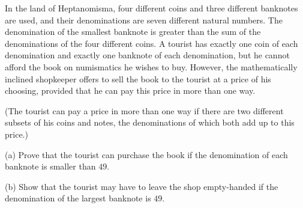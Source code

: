 In the land of Heptanomisma, four different coins and three different banknotes are used, and their denominations are seven different natural numbers. The denomination of the smallest banknote is greater than the sum of the denominations of the four different coins. A tourist has exactly one coin of each denomination and exactly one banknote of each denomination, but he cannot afford the book on numismatics he wishes to buy. However, the mathematically inclined shopkeeper offers to sell the book to the tourist at a price of his choosing, provided that he can pay this price in more than one way.

(The tourist can pay a price in more than one way if there are two different subsets of his coins and notes, the denominations of which both add up to this price.)

(a) Prove that the tourist can purchase the book if the denomination of each banknote is smaller than $49$.

(b) Show that the tourist may have to leave the shop empty-handed if the denomination of the largest banknote is $49$.